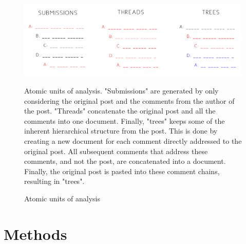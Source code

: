 \documentclass{article}
\begin{document}
\begin{figure}[H]
    \begin{centering}
    \includegraphics[width = \textwidth]{../Figure/atomic_units.jpg}
    \caption{Atomic units of analysis}
    \end{centering}
    \begin{footnotesize} 
        Atomic units of analysis. "Submissions" are generated by only considering the original post and the comments from the author of the post. "Threads" concatenate the original post and all the comments into one document. Finally, "trees" keeps some of the inherent hierarchical structure from the post. This is done by creating a new document for each comment directly addressed to the original post. All subsequent comments that address these comments, and not the post, are concatenated into a document. Finally, the original post is pasted into these comment chains, resulting in "trees".
    \end{footnotesize}
\end{figure}

    \section{Methods}
\end{document}
